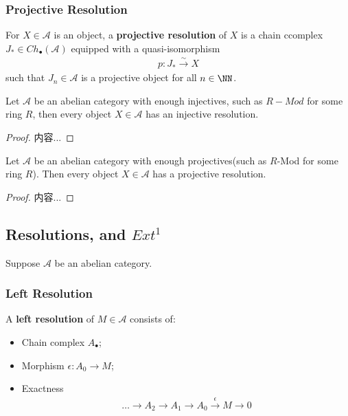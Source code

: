 \documentclass[Total.tex]{subfiles}
\begin{document}
					\subsubsection{Projective Resolution}
					\begin{Def}
					For $X\in \mathcal{A}$ is an object, a \textbf{projective resolution} of $X$ is a chain ccomplex $J_*\in Ch_\bullet(\mathcal{A})$ equipped with a quasi-isomorphism
					\begin{gather*}
						p:J_*\stackrel{\sim}{\rightarrow} X
					\end{gather*}
					such that $J_n\in \mathcal{A}$ is a projective object for all $n\in \NN$.
					\end{Def}
					\begin{center}
					\end{center}
					
					\begin{proposition}
					Let $\mathcal{A}$ be an abelian category with enough injectives, such as $R-Mod$ for some ring $R$, then every object $X\in \mathcal{A}$ has an injective resolution.
					\end{proposition}
					\begin{proof}
					内容...
					\end{proof}
					\begin{proposition}
					Let $\mathcal{A}$ be an abelian category with enough projectives(such as $R$-Mod for some ring $R$). Then every object $X\in \mathcal{A}$ has a projective resolution.
					\end{proposition}
					\begin{proof}
					内容...
					\end{proof}
					\subsection{Resolutions, and $Ext^1$}
					Suppose $\mathcal{A}$ be an abelian category.
					\subsubsection{Left Resolution}
					
					\begin{Def}
					A \textbf{left resolution} of $M\in \mathcal{A}$ consists of:
					\begin{itemize}
						\item Chain complex $A_\bullet$;
						\item Morphism $\epsilon:A_0\rightarrow M$;
						\item Exactness
						\begin{gather*}
							\dots\rightarrow A_2\rightarrow A_1\rightarrow A_0\stackrel{\epsilon}{\rightarrow} M\rightarrow 0
						\end{gather*}
					\end{itemize}
					\end{Def}
\end{document}
